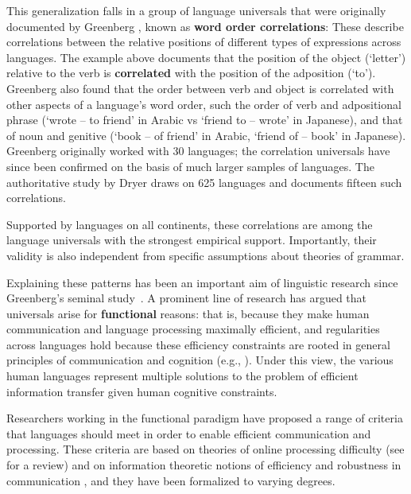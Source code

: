 \documentclass[9pt,twocolumn,twoside,lineno]{pnas-new}
\newcommand{\key}[1]{\textbf{#1}}
\begin{document}
This generalization falls in a group of language universals that were originally documented by Greenberg \cite{greenberg1963universals}, known as \key{word order correlations}:
These describe correlations between the relative positions of different types of expressions across languages.
The example above documents that the position of the object (`letter') relative to the verb is \key{correlated} with the position of the adposition (`to'). %
Greenberg also found that the order between verb and object is correlated with other aspects of a language's word order, such the order of verb and adpositional phrase (`wrote -- to friend' in Arabic vs `friend to -- wrote' in Japanese), and that of noun and genitive (`book -- of friend' in Arabic, `friend of -- book' in Japanese).
Greenberg originally worked with 30 languages; the correlation universals have since been confirmed on the basis of much larger samples of languages.
The authoritative study by Dryer \cite{dryer1992greenbergian} draws on 625 languages and documents fifteen such correlations.




Supported by languages on all continents, these correlations are among the language universals with the strongest empirical support.
Importantly, their validity is also independent from specific assumptions about theories of grammar.



Explaining these patterns has been an important aim of linguistic research since Greenberg's seminal study~\cite{lehmann1973structural, vennemann1974theoretical,jackendoff1977x,frazier1985syntactic,chomsky1988language, dryer1992greenbergian, hawkins1994performance}.
A prominent line of research has argued that universals arise for \key{functional} reasons: that is, because they make human communication and language processing maximally efficient, and regularities across languages hold because these efficiency constraints are rooted in general principles of communication and cognition (e.g., \cite{gabelentz1901sprachwissenschaft,zipf1949human,hockett1960origin,givon1991markedness,hawkins1994performance,hawkins2004efficiency,hawkins2014crosslinguistic,croft2001functional,haspelmath2008parametric,jaeger2011language}).
Under this view, the various human languages represent multiple solutions to the problem of efficient information transfer given human cognitive constraints.

Researchers working in the functional paradigm have proposed a range of criteria that languages should meet in order to enable efficient communication and processing. These criteria are based on theories of online processing difficulty (see \cite{jaeger2011language} for a review) and on information theoretic notions of efficiency and robustness in communication \cite{ferrericancho2001two,piantadosi2011word,gibson2013noisy}, and they have been formalized to varying degrees. 
\end{document}
